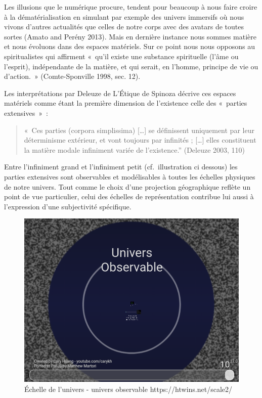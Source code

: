 \documentclass[
  letterpaper,
  DIV=11,
  numbers=noendperiod]{scrreprt}
\begin{document}
Les illusions que le numérique procure, tendent pour beaucoup à nous
faire croire à la dématérialisation en simulant par exemple des univers
immersifs où nous vivons d'autres actualités que celles de notre corps
avec des avatars de toutes sortes (Amato and Perény 2013). Mais en
dernière instance nous sommes matière et nous évoluons dans des espaces
matériels. Sur ce point nous nous opposons au spiritualistes qui
affirment «~qu'il existe une substance spirituelle (l'âme ou l'esprit),
indépendante de la matière, et qui serait, en l'homme, principe de vie
ou d'action.~» (Comte-Sponville 1998, sec. 12).

Les interprétations par Deleuze de L'Étique de Spinoza décrive ces
espaces matériels comme étant la première dimension de l'existence celle
des «~parties extensives~»~:

\begin{quote}
«~Ces parties (corpora simplissima) {[}\ldots{]} se définissent
uniquement par leur déterminisme extérieur, et vont toujours par
infinités ; {[}\ldots{]} elles constituent la matière modale infiniment
variée de l'existence.'' (Deleuze 2003, 110)
\end{quote}

Entre l'infiniment grand et l'infiniment petit (cf.~illustration ci
dessous) les parties extensives sont observables et modélisables à
toutes les échelles physiques de notre univers. Tout comme le choix
d'une projection géographique reflète un point de vue particulier, celui
des échelles de représentation contribue lui aussi à l'expression d'une
subjectivité spécifique.

\begin{figure}

{\centering \includegraphics{media/10000001000003080000024F28EEAE4E22F24B62.png}

}

\caption{\label{fig-echelleUnivers}Échelle de l'univers - univers
observable https://htwins.net/scale2/}

\end{figure}
\end{document}

